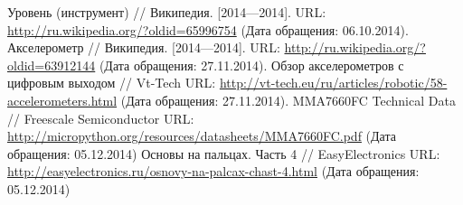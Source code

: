 \documentclass[document.tex]{subfiles}
\begin{document}
\clearpage
{}
\begin{thebibliography}{@@@@}	
		Уровень (инструмент) // Википедия. [2014—2014].
		URL: {\url{http://ru.wikipedia.org/?oldid=65996754}} 
		(Дата обращения: 06.10.2014).
		Акселерометр // Википедия. [2014—2014]. 
		URL: {\url{http://ru.wikipedia.org/?oldid=63912144}}
		(Дата обращения: 27.11.2014).
		Обзор акселерометров с цифровым выходом // Vt-Tech
		URL: {\url{http://vt-tech.eu/ru/articles/robotic/58-accelerometers.html}}
		(Дата обращения: 27.11.2014).
		MMA7660FC Technical Data // Freescale Semiconductor
		URL: {\url{http://micropython.org/resources/datasheets/MMA7660FC.pdf}}
		(Дата обращения: 05.12.2014)
		Основы на пальцах. Часть 4 // EasyElectronics
		URL: {\url{http://easyelectronics.ru/osnovy-na-palcax-chast-4.html}}
		(Дата обращения: 05.12.2014)
	\end{thebibliography}
\end{document}
